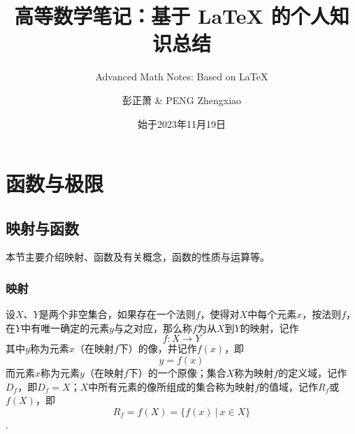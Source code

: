 \documentclass[lang=cn,10pt]{elegantbook}
\title{高等数学笔记：基于 \LaTeX{} 的个人知识总结}
\subtitle{Advanced Math Notes: Based on \LaTeX{}}
\author{彭正萧 \& PENG Zhengxiao}
\institute{西北农林科技大学}
\date{始于2023年11月19日}
\begin{document}
\maketitle
\frontmatter

\tableofcontents

\mainmatter

\chapter{函数与极限}

\section{映射与函数}

本节主要介绍映射、函数及有关概念，函数的性质与运算等。

\subsection{映射}

\begin{definition}
	设\(X\)、\( Y \)是两个非空集合，如果存在一个法则\( f \)，使得对\( X \)中每个元素\( x \)，按法则\( f \)，在\( Y \)中有唯一确定的元素\( y \)与之对应，那么称\( f \)为从\( X \)到\( Y \)的映射，记作
	\[ f:X \rightarrow Y \]
	其中\( y \)称为元素\( x \)（在映射\( f \)下）的像，并记作\( f(x) \)，即
	\[ y = f(x) \]
	而元素\( x \)称为元素\( y \)（在映射\( f \)下）的一个原像；集合\( X \)称为映射\( f \)的定义域，记作\( D_{f} \)，即\( D_{f} = X \)；\( X \)中所有元素的像所组成的集合称为映射\( f \)的值域，记作\( R_{f} \)或\( f(X) \)，即
	\[ R_{f} = f(X) = \{ f(x)\ |\ x \in X\}\].
\end{definition}
\end{document}
